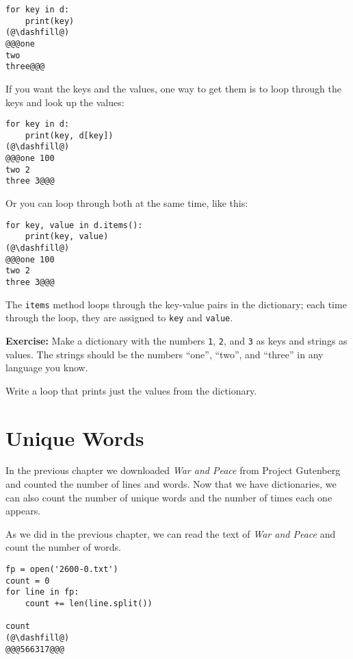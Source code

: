 \begin{lstlisting}[]
for key in d:
    print(key)
(@\dashfill@)
@@@one
two
three@@@
\end{lstlisting}

If you want the keys and the values, one way to get them is to loop
through the keys and look up the values:

\begin{lstlisting}[]
for key in d:
    print(key, d[key])
(@\dashfill@)
@@@one 100
two 2
three 3@@@
\end{lstlisting}

Or you can loop through both at the same time, like this:

\begin{lstlisting}[]
for key, value in d.items():
    print(key, value)
(@\dashfill@)
@@@one 100
two 2
three 3@@@
\end{lstlisting}

The \passthrough{\lstinline!items!} method loops through the key-value
pairs in the dictionary; each time through the loop, they are assigned
to \passthrough{\lstinline!key!} and \passthrough{\lstinline!value!}.

\textbf{Exercise:} Make a dictionary with the numbers
\passthrough{\lstinline!1!}, \passthrough{\lstinline!2!}, and
\passthrough{\lstinline!3!} as keys and strings as values. The strings
should be the numbers ``one'', ``two'', and ``three'' in any language
you know.

Write a loop that prints just the values from the dictionary.

\hypertarget{unique-words}{%
\section{Unique Words}\label{unique-words}}

In the previous chapter we downloaded \emph{War and Peace} from Project
Gutenberg and counted the number of lines and words. Now that we have
dictionaries, we can also count the number of unique words and the
number of times each one appears.

As we did in the previous chapter, we can read the text of \emph{War and
Peace} and count the number of words.

\begin{lstlisting}[]
fp = open('2600-0.txt')
count = 0
for line in fp:
    count += len(line.split())
    
count
(@\dashfill@)
@@@566317@@@
\end{lstlisting}

